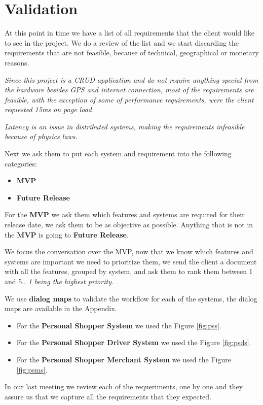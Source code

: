 \section{Validation }
At this point in time we have a list of all requirements that the client would 
like to see in the project. We do a review of the list and we start discarding 
the requirements that are not feasible, because of technical, geographical or 
monetary reasons. \newline

\noindent \textit{Since this project is a CRUD application \cite{crud} and do 
not require anything special from the hardware besides GPS and internet 
connection, most of the requirements are feasible, with the exception of 
some of performance requirements, were the client 
requested 15ms on page load.}\newline

\noindent \textit{Latency is an issue in distributed systems, making the 
requirements infeasible because of physics laws}. \newline

\noindent Next we ask them to put each system and requirement into the 
following categories:
\begin{itemize}
    \item \textbf{MVP} \cite{mvp}
    \item \textbf{Future Release}
\end{itemize}

\noindent For the \textbf{MVP} we ask them which features and systems are 
required for their release date, we ask them to be as objective as possible. 
Anything that is not in the \textbf{MVP} is going to 
\textbf{Future Release}. \newline

\noindent We focus the conversation over the MVP, now that we know which 
features and systems are important we need to prioritize them,  we send the 
client a document with all the features, grouped by system, and ask them to 
rank them between 1 and 5.. \textit{1 being the highest priority}. \newline

\noindent We use \textbf{dialog maps} to validate the workflow for each of 
the systems, the dialog maps are available in the Appendix. 
\begin{itemize}
    \item For the \textbf{Personal Shopper System} we used 
    the Figure \ref{fig:pss}. 
    \item For the \textbf{Personal Shopper Driver System} we used 
    the Figure \ref{fig:psds}. 
    \item For the \textbf{Personal Shopper Merchant System} we used 
    the Figure \ref{fig:psms}. 
\end{itemize}

\noindent In our last meeting we review each of the requeriments, one by one 
and they assure us that we capture all the requirements that they expected.